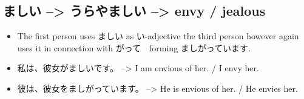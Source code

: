\documentclass{article}
\begin{document}
\subsection{ましい --> うらやましい --> envy / jealous }
\begin{itemize}
\item The first person uses ましい as い-adjective the third person however again uses it in connection with がって　forming ましがっています.
\item 私は、彼女がましいです。 --> I am envious of her. / I envy her.
\item 彼は、彼女をましがっています。 --> He is envious of her. / He envies her.
\end{itemize}
\end{document}
